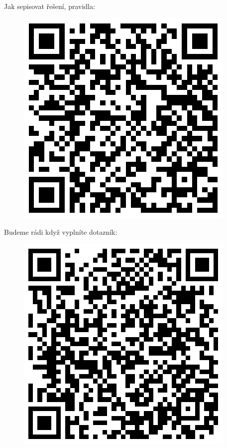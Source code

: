\documentclass[12pt]{article}
\begin{document}
Jak sepisovat řešení, pravidla:
\begin{figure}[H]
\includegraphics[scale=0.3]{../../../../propagace/qrcodes/instructions.png}
\end{figure}

Budeme rádi když vyplníte dotazník:
\begin{figure}[H]
\includegraphics[scale=0.3]{../../../../propagace/qrcodes/dotaznik.png}
\end{figure}

\vspace*{\fill}
\end{document}
